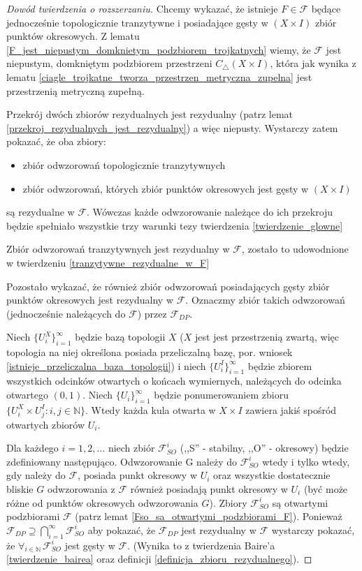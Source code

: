 \documentclass[licencjacka]{pwr_wmat_praca_dyplomowa}
\theoremstyle{plain}
\numberwithin{theorem}{chapter}
\theoremstyle{definition}
\numberwithin{theorem}{chapter}
\begin{document}
\begin{proof}[Dowód twierdzenia o rozszerzaniu]
Chcemy wykazać, że istnieje $F \in \mathcal{F}$ będące jednocześnie topologicznie tranzytywne i posiadające gęsty w $(X \times I)$ zbiór punktów okresowych. Z lematu \ref{F_jest_niepustym_domknietym_podzbiorem_trojkatnych} wiemy, że $\mathcal{F}$ jest niepustym, domkniętym podzbiorem przestrzeni $C_{\triangle}(X \times I)$, która jak wynika z lematu \ref{ciagle_trojkatne_tworza_przestrzen_metryczna_zupelna} jest przestrzenią metryczną zupełną. 

Przekrój dwóch zbiorów rezydualnych jest rezydualny (patrz lemat \ref{przekroj_rezydualnych_jest_rezydualny}) a więc niepusty. Wystarczy zatem pokazać, że oba zbiory:
\begin{itemize}
\item zbiór odwzorowań topologicznie tranzytywnych
\item zbiór odwzorowań, których zbiór punktów okresowych jest gęsty w $(X \times I)$
\end{itemize}
są rezydualne w $\mathcal{F}$. Wówczas każde odwzorowanie należące do ich przekroju będzie spełniało wszystkie trzy warunki tezy twierdzenia \ref{twierdzenie_glowne} 

Zbiór odwzorowań tranzytywnych jest rezydualny w $\mathcal{F}$, zostało to udowodnione w twierdzeniu \ref{tranzytywne_rezydualne_w_F}

Pozostało wykazać, że również zbiór odwzorowań posiadających gęsty zbiór punktów okresowych jest rezydualny w $\mathcal{F}$.
Oznaczmy zbiór takich odwzorowań (jednocześnie należących do $\mathcal{F}$) przez $\mathcal{F}_{DP}$.

Niech $\{U_i^X\}_{i=1}^{\infty}$ będzie bazą topologii $X$ ($X$ jest jest przestrzenią zwartą, więc topologia na niej określona posiada przeliczalną bazę, por. wniosek \ref{istnieje_przeliczalna_baza_topologii}) i niech $\{U_i^I\}_{i=1}^{\infty}$ będzie zbiorem wszystkich odcinków otwartych o końcach wymiernych, należących do odcinka otwartego $(0, 1)$. Niech $\{U_i\}_{i=1}^{\infty}$ będzie ponumerowaniem zbioru $\{U_i^X \times U_j^I : i,j \in \mathbb{N}\}$. Wtedy każda kula otwarta w $X \times I$ zawiera jakiś spośród otwartych zbiorów $U_i$.

Dla każdego $i=1,2,...$ niech zbiór $\mathcal{F}_{SO}^i$ (,,S'' - stabilny, ,,O'' - okresowy) będzie zdefiniowany następująco. Odwzorowanie G należy do $\mathcal{F}_{SO}^i$ wtedy i tylko wtedy, gdy należy do $\mathcal{F}$, posiada punkt okresowy w $U_i$ oraz wszystkie dostatecznie bliskie $G$ odwzorowania z $\mathcal{F}$ również posiadają punkt okresowy w $U_i$ (być może różne od punktów okresowych odwzorowania $G$). Zbiory $\mathcal{F}_{SO}^i$ są otwartymi podzbiorami $\mathcal{F}$ (patrz lemat \ref{Fso_sa_otwartymi_podzbiorami_F}). Ponieważ $\mathcal{F}_{DP} \supseteq \bigcap_{i=1}^{\infty} \mathcal{F}_{SO}^i$ aby pokazać, że $\mathcal{F}_{DP}$ jest rezydualny w $\mathcal{F}$ wystarczy pokazać, że $\forall_{i \in \mathbb{N}} \, \mathcal{F}_{SO}^i$ jest gęsty w $\mathcal{F}$. (Wynika to z twierdzenia Baire'a \ref{twierdzenie_bairea} oraz definicji \ref{definicja_zbioru_rezydualnego}).


\end{proof}
\end{document}
